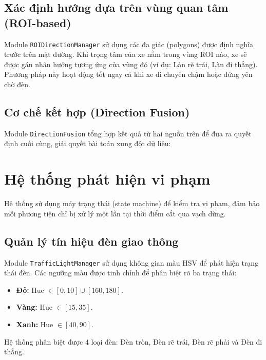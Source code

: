 \subsection{Xác định hướng dựa trên vùng quan tâm (ROI-based)}
Module \texttt{ROIDirectionManager} sử dụng các đa giác (polygons) được định nghĩa trước trên mặt đường. Khi trọng tâm của xe nằm trong vùng ROI nào, xe sẽ được gán nhãn hướng tương ứng của vùng đó (ví dụ: Làn rẽ trái, Làn đi thẳng). Phương pháp này hoạt động tốt ngay cả khi xe di chuyển chậm hoặc đứng yên chờ đèn.

\subsection{Cơ chế kết hợp (Direction Fusion)}
Module \texttt{DirectionFusion} tổng hợp kết quả từ hai nguồn trên để đưa ra quyết định cuối cùng, giải quyết bài toán xung đột dữ liệu:

\begin{algorithm}[!ht]
\SetAlgoLined
{}

\caption{Thuật toán Direction Fusion}
\label{alg:fusion}
\end{algorithm}

\section{Hệ thống phát hiện vi phạm}
\label{sec:violation_logic}

Hệ thống sử dụng máy trạng thái (state machine) để kiểm tra vi phạm, đảm bảo mỗi phương tiện chỉ bị xử lý một lần tại thời điểm cắt qua vạch dừng.

\subsection{Quản lý tín hiệu đèn giao thông}
Module \texttt{TrafficLightManager} sử dụng không gian màu HSV để phát hiện trạng thái đèn. Các ngưỡng màu được tinh chỉnh để phân biệt rõ ba trạng thái:
\begin{itemize}
    \item \textbf{Đỏ:} Hue $\in [0, 10] \cup [160, 180]$.
    \item \textbf{Vàng:} Hue $\in [15, 35]$.
    \item \textbf{Xanh:} Hue $\in [40, 90]$.
\end{itemize}
Hệ thống phân biệt được 4 loại đèn: Đèn tròn, Đèn rẽ trái, Đèn rẽ phải và Đèn đi thẳng.

